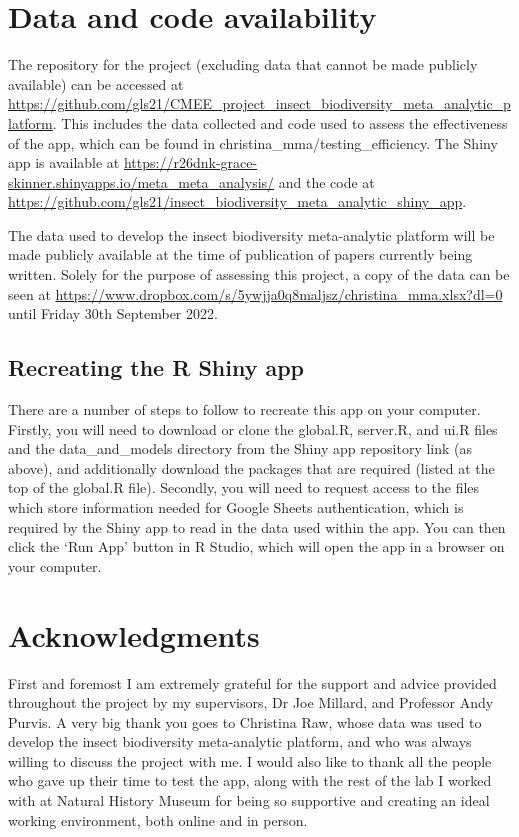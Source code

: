 \documentclass[11pt]{article}
\begin{document}
		\clearpage 
		
		\section{Data and code availability}
		The repository for the project (excluding data that cannot be made publicly available) can be accessed at \url{https://github.com/gls21/CMEE_project_insect_biodiversity_meta_analytic_platform}. This includes the data collected and code used to assess the effectiveness of the app, which can be found in christina\_mma/testing\_efficiency. The Shiny app is available at \url{https://r26dnk-grace-skinner.shinyapps.io/meta_meta_analysis/} and the code at \url{https://github.com/gls21/insect_biodiversity_meta_analytic_shiny_app}. 
		
		\noindent The data used to develop the insect biodiversity meta-analytic platform will be made publicly available at the time of publication of papers currently being written. Solely for the purpose of assessing this project, a copy of the data can be seen at \url{https://www.dropbox.com/s/5ywjja0q8maljsz/christina_mma.xlsx?dl=0} until Friday 30th September 2022. 
		
		\subsection{Recreating the R Shiny app}
		There are a number of steps to follow to recreate this app on your computer. Firstly, you will need to download or clone the global.R, server.R, and ui.R files and the data\_and\_models directory from the Shiny app repository link (as above), and additionally download the packages that are required (listed at the top of the global.R file). Secondly, you will need to request access to the files which store information needed for Google Sheets authentication, which is required by the Shiny app to read in the data used within the app. You can then click the ‘Run App’ button in R Studio, which will open the app in a browser on your computer.
		
		\clearpage
		
	\section{Acknowledgments}	
		First and foremost I am extremely grateful for the support and advice provided throughout the project by my supervisors, Dr Joe Millard, and Professor Andy Purvis. A very big thank you goes to Christina Raw, whose data was used to develop the insect biodiversity meta-analytic platform, and who was always willing to discuss the project with me. I would also like to thank all the people who gave up their time to test the app, along with the rest of the lab I worked with at Natural History Museum for being so supportive and creating an ideal working environment, both online and in person. 
	
	\clearpage
	
	

	
	
\end{document}
